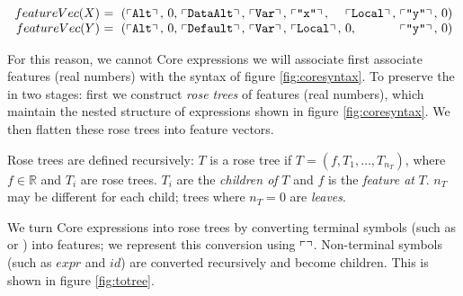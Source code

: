 \begin{small}
  \begin{equation*}
    \begin{array}{r@{}l@{}l@{}l@{}l@{}l@{}l@{}l@{}l@{}l}
      featureVec(X)\ &=\ (\feature{\CAlt},\ &0,\ &\feature{\CDataAlt},\ &\feature{\CVar},\ &\feature{\id{x}},\  &\feature{\CLocal},\ &\feature{\id{y}},\ &0 &) \\
      featureVec(Y)\ &=\ (\feature{\CAlt},\ &0,\ &\feature{\CDefault},\ &\feature{\CVar},\ &\feature{\CLocal},\ &0,\                 &\feature{\id{y}},\ &0 &)
    \end{array}
  \end{equation*}
\end{small}

For this reason, we cannot Core expressions  we will associate first associate features (real numbers) with the syntax of figure \ref{fig:coresyntax}. To preserve the in two stages: first we construct \emph{rose trees} of features (real numbers), which maintain the nested structure of expressions shown in figure \ref{fig:coresyntax}. We then flatten these rose trees into feature vectors.

Rose trees are defined recursively: $T$ is a rose tree if $T = (f, T_1, \dots, T_{n_T})$, where $f \in \mathbb{R}$ and $T_i$ are rose trees. $T_i$ are the \emph{children of} $T$ and $f$ is the \emph{feature at} $T$. $n_T$ may be different for each child; trees where $n_T = 0$ are \emph{leaves}.

We turn Core expressions into rose trees by converting terminal symbols (such as  or ) into features; we represent this conversion using $\left\ulcorner  \right\urcorner$. Non-terminal symbols (such as $expr$ and $id$) are converted recursively and become children. This is shown in figure \ref{fig:totree}.

